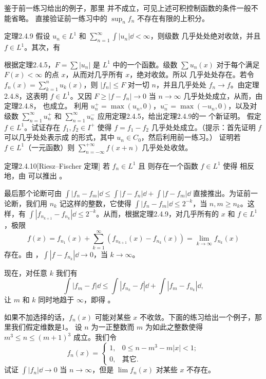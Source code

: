 鉴于前一练习给出的例子，那里  并不成立，可见上述可积控制函数的条件一般不能省略。
\Exercise 直接验证前一练习中的 $\sup_n f_n$ 不存在有限的上积分。
\begin{statement}{定理}{2.4.9}
假设 $u_n\in L^1$ 和 $\sum_{n=1}^\infty\int|u_n|\dd<\infty$，则级数
几乎处处绝对收敛，并且 $f\in L^1$。其次，有
\end{statement}
\Proof 根据定理2.4.5，$F=\sum|u_n|$ 是 $L^1$ 中的一个函数。级数 $\sum u_n(x)$ 对于每个满足 $F(x)<\infty$ 的点 $x$，从而对几乎所有 $x$，绝对收敛。所以  几乎处处存在。若令 $f_n(x)=\sum_{k=1}^n u_k(x)$，则 $|f_n|\le F$ 对一切 $n$，并且几乎处处 $f_n\to f$。由定理2.4.8，这表明 $f\in L^1$。又因 $F\ge|f-f_n|\to0$ 当 $n\to\infty$ 几乎处处成立，从而，由定理2.4.8， 也成立。
\Exercise 利用 $u_n^+=\max(u_n,0)$，$u_n^-=\max(-u_n,0)$，以及对级数 $\sum_{n=1}^\infty u_n^+$ 和 $\sum_{n=1}^\infty u_n^-$ 应用定理2.4.5，给出定理2.4.9的一
个新证明。
\Exercise 假定 $f\in L^1$。试证存在 $f_1,f_2\in I^+$ 使得 $f=f_1-f_2$ 几乎处处成立。（提示：首先证明 $f$ 可以几乎处处表示成  的形式，其中 $u_n\in C_0$，然后利用前一练习。）
\Exercise 证明若 $f\in L^1$（一元函数）则 $\sum_{n=-\infty}^{+\infty}f(x+n)$ 几乎处处收敛。
\begin{statement}{定理}{2.4.10}[Riesz--Fischer 定理]
若 $f_n\in L^1$ 且
则存在一个函数 $f\in L^1$ 使得
相反地，由  可以推出 。
\end{statement}
\Proof 最后那个论断可由 $\int|f_n-f_m|\dd\le\int|f-f_n|\dd+\int|f-f_m|\dd$ 直接推出。为证前一论断，我们用 $n_k$ 记这样的整数，它使得 $\int|f_n-f_m|\dd\le2^{-k}$，当 $n,m\ge n_k$。这样，有 $\int|f_{n_{k+1}}-f_{n_k}|\dd\le2^{-k}$。从而，根据定理2.4.9，对几乎所有的 $x$ 和 $f\in L^1$，极限
\[f(x)=f_{n_1}(x)+\sum_{k=1}^\infty(f_{n_{k+1}}(x)-f_{n_k}(x))=\lim_{k\to\infty}f_{n_k}(x)\]
存在。由 ，$\int|f-f_{n_k}|\dd\to0$，当 $k\to\infty$。

现在，对任意 $k$ 我们有
\[\int|f_m-f|\dd\le\int|f_{n_k}-f|\dd+\int|f_m-f_{n_k}|\dd,\]
让 $m$ 和 $k$ 同时地趋于 $\infty$，即得 。

如果不加选择的话，$f_n(x)$ 可能对某些 $x$ 不收敛。下面的练习给出一个例子，那里我们假定维数是1。
\Exercise 设 $n$ 为一正整数而 $m$ 为如此之整数使得 $m^3\le n\le(m+1)^3$ 成立。我们令
\[f_n(x)=\begin{cases}1,&0\le n-m^3-m|x|<1;\\0,&\text{其它}.\end{cases}\]
试证 $\int|f_n|\dd\to0$ 当 $n\to\infty$，但是 $\lim f_n(x)$ 对某些 $x$ 不存在。

